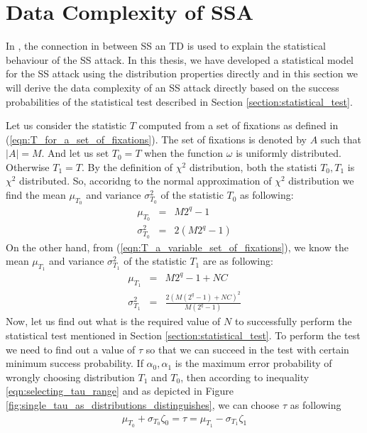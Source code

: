 \chapter{Data Complexity of SSA}
\label{chapter:data_complexity_of_SSA}
In \cite{Celine_Kaisa_Links_2014}, the connection in between SS an TD is used to explain the statistical behaviour of the SS attack. In this thesis, we have developed a statistical model for the SS attack using the distribution properties directly and in this section we will derive the data complexity of an SS attack directly based on the success probabilities of the statistical test described in Section \ref{section:statistical_test}.
\par \noindent Let us consider the statistic $T$ computed from a set of fixations as defined in (\ref{eqn:T_for_a_set_of_fixations}). The set of fixations is denoted by $A$ such that $|A| = M$. And let us set $T_0 = T$ when the function $\omega$ is uniformly distributed. Otherwise $T_1 = T$. By the definition of $\chi^2$ distribution, both the statisti $T_0,T_1$ is $\chi^2$ distributed. So, accoridng to the normal approximation of $\chi^2$ distribution we find the mean $\mu_{T_0}$ and variance $\sigma^2_{T_0}$ of the statistic $T_0$ as following:
\begin{eqnarray}
\mu_{T_0} &=& M2^{q} - 1 \label{eqn:mean_T_0}\\
\sigma^2_{T_0} &=& 2(M2^{q} - 1) \label{eqn:variance_T_0}
\end{eqnarray}
On the other hand, from (\ref{eqn:T_a_variable_set_of_fixations}), we know the mean $\mu_{T_1}$ and variance $\sigma^2_{T_1}$ of the statistic $T_1$ are as following:
\begin{eqnarray}
\mu_{T_1} &=& M2^q-1 + NC \label{eqn:mean_T_1}\\
\sigma^2_{T_1} &=& \frac{2(M(2^q-1)+ NC)^2}{M(2^q-1)} \label{eqn:variance_T_1}
\end{eqnarray}
Now, let us find out what is the required value of $N$ to successfully perform the statistical test mentioned in Section \ref{section:statistical_test}. To perform the test we need to find out a value of $\tau$ so that we can succeed in the test with certain minimum success probability. If $\alpha_0,\alpha_1$ is the maximum error probability of wrongly choosing distribution $T_1$ and $T_0$, then according to inequality \ref{eqn:selecting_tau_range} and as depicted in Figure \ref{fig:single_tau_as_distributions_distinguishes}, we can choose $\tau$ as following
\begin{eqnarray}
\mu_{T_0}+\sigma_{T_0}\zeta_0 = \tau = \mu_{T_1} - \sigma_{T_1}\zeta_1 \label{eqn:feasible_tau}
\end{eqnarray}
